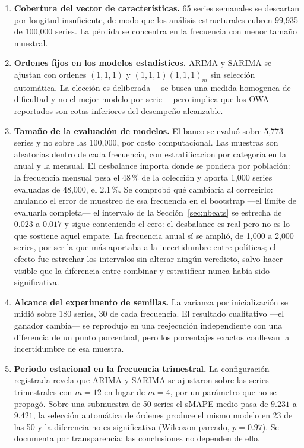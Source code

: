 \begin{enumerate}
\item \textbf{Cobertura del vector de características.} 65 series semanales se
      descartan por longitud insuficiente, de modo que los análisis estructurales
      cubren 99{,}935 de 100{,}000 series. La pérdida se concentra en la frecuencia
      con menor tamaño muestral.

\item \textbf{Ordenes fijos en los modelos estadísticos.} ARIMA y SARIMA se ajustan
      con ordenes $(1,1,1)$ y $(1,1,1)(1,1,1)_m$ sin selección automática. La
      elección es deliberada ---se busca una medida homogenea de dificultad y no el
      mejor modelo por serie--- pero implica que los OWA reportados son cotas
      inferiores del desempeño alcanzable.

\item \textbf{Tamaño de la evaluación de modelos.} El banco se evaluó
      sobre 5{,}773 series y no sobre las 100{,}000, por costo computacional. Las
      muestras son aleatorias dentro de cada frecuencia, con estratificacion por
      categoría en la anual y la mensual. El desbalance importa donde se pondera por
      población: la frecuencia mensual pesa el 48\,\% de la colección y aporta
      1{,}000 series evaluadas de 48{,}000, el 2.1\,\%. Se comprobó qué cambiaría al
      corregirlo: anulando el error de muestreo de esa frecuencia en el bootstrap
      ---el límite de evaluarla completa--- el intervalo de la
      Sección~\ref{sec:nbeats} se estrecha de $0.023$ a $0.017$ y sigue conteniendo el
      cero: el desbalance es real pero no es lo que sostiene aquel empate. La frecuencia
      anual sí se amplió, de 1{,}000 a 2{,}000 series, por ser la que más aportaba a la
      incertidumbre entre políticas; el efecto fue estrechar los intervalos sin alterar
      ningún veredicto, salvo hacer visible que la diferencia entre combinar y
      estratificar nunca había sido significativa.

\item \textbf{Alcance del experimento de semillas.} La varianza por inicialización
      se midió sobre 180 series, 30 de cada frecuencia. El resultado cualitativo
      ---el ganador cambia--- se reprodujo en una reejecución independiente con una
      diferencia de un punto porcentual, pero los porcentajes exactos conllevan la
      incertidumbre de esa muestra.

\item \textbf{Periodo estacional en la frecuencia trimestral.} La configuración
      registrada revela que ARIMA y SARIMA se ajustaron sobre las series trimestrales
      con $m=12$ en lugar de $m=4$, por un parámetro que no se propagó. Sobre una
      submuestra de 50 series el sMAPE medio pasa de $9.231$ a $9.421$, la selección
      automática de órdenes produce el mismo modelo en 23 de las 50 y la diferencia no
      es significativa (Wilcoxon pareado, $p=0.97$). Se documenta por transparencia; las
      conclusiones no dependen de ello.


\end{enumerate}
